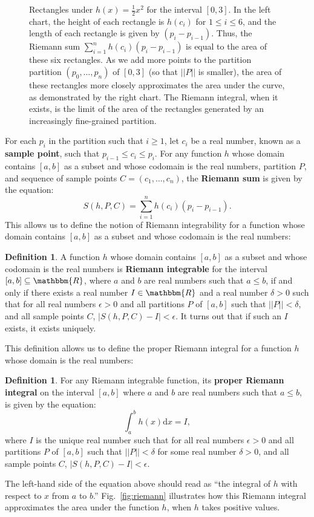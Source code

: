 \documentclass[11pt]{article}
\theoremstyle{definition}
\newtheorem{definition}[theorem]{Definition}
\theoremstyle{remark}
\begin{document}
\begin{figure}[]
\caption{Rectangles under $h(x)=\frac12 x^2$ for the interval $[0,3]$. In the left chart, the height of each rectangle is $h(c_{i})$ for $1\leq i\leq 6$, and the length of each rectangle is given by $(p_i-p_{i-1})$. Thus, the Riemann sum $\sum_{i=1}^{n}h(c_{i})(p_{i}-p_{i-1})$ is equal to the area of these six rectangles. As we add more points to the partition partition $(p_{0},\dots,p_{n})$ of $[0,3]$ (so that $||P||$ is smaller), the area of these rectangles more closely approximates the area under the curve, as demonstrated by the right chart. The Riemann integral, when it exists, is the limit of the area of the rectangles generated by an increasingly fine-grained partition.}\label{fig:riemann}
\label{fig:riemann_comparison}
\end{figure}

For each $p_{i}$ in the partition such that $i\geq1$, let $c_{i}$ be a real number, known as a \textbf{sample point}, such that $p_{i-1}\leq c_{i}\leq p_{i}$. For any function $h$ whose domain contains $[a,b]$ as a subset and whose codomain is the real numbers, partition $P$, and sequence of sample points $C=(c_{1},\dots,c_{n})$, the \textbf{Riemann sum} is given by the equation:
$$S(h,P,C)=\sum_{i=1}^{n}h(c_{i})(p_{i}-p_{i-1}).$$
This allows us to define the notion of Riemann integrability for a function whose domain contains $[a,b]$ as a subset and whose codomain is the real numbers:
\begin{definition}
    A function $h$ whose domain contains $[a,b]$ as a subset and whose codomain is the real numbers is \textbf{Riemann integrable} for the interval $[a,b]\subseteq\mathbbm{R}$, where $a$ and $b$ are real numbers such that $a\leq b$, if and only if there exists a real number $I\in\mathbbm{R}$ and a real number $\delta>0$ such that for all real numbers $\epsilon>0$ and all partitions $P$ of $[a,b]$ such that $||P||<\delta$, and all sample points $C$, $|S(h,P,C)-I|<\epsilon$. It turns out that if such an $I$ exists, it exists uniquely.
\end{definition}
\noindent
This definition allows us to define the proper Riemann integral for a function $h$ whose domain is the real numbers:
\begin{definition}
    For any Riemann integrable function, its \textbf{proper Riemann integral} on the interval $[a,b]$ where $a$ and $b$ are real numbers such that $a\leq b$, is given by the equation:
    $$\int_{a}^{b}h(x)\textrm{d}x = I,$$
    where $I$ is the unique real number such that for all real numbers $\epsilon>0$ and all partitions $P$ of $[a,b]$ such that $||P||<\delta$ for some real number $\delta>0$, and all sample points $C$, $|S(h,P,C)-I|<\epsilon$.
\end{definition}
\noindent
The left-hand side of the equation above should read as ``the integral of $h$ with respect to $x$ from $a$ to $b$.'' Fig.~\ref{fig:riemann} illustrates how this Riemann integral approximates the area under the function $h$, when $h$ takes positive values.
\end{document}
